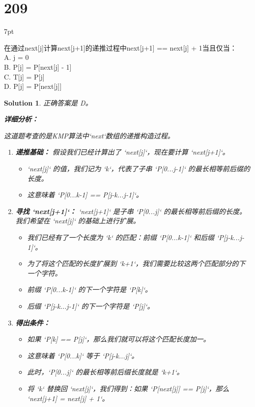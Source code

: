 \documentclass[UTF8]{report}
\newtheorem{solution}{Solution}
\theoremstyle{MyLineTheoremStyle} %
\theoremstyle{MyBlockTheoremStyle} %
\theoremstyle{MySubsubsectionStyle} %
\newenvironment{graybox}{%
        \def\FrameCommand{%
        \hspace{1pt}%
        {\color{gray}\small \vrule width 2pt}%
        {\color{graybox_color}\vrule width 4pt}%
        \colorbox{graybox_color}%
        }%
        \MakeFramed{\advance\hsize-\width\FrameRestore}%
        \noindent\hspace{-4.55pt}%
        \begin{adjustwidth}{}{7pt}%
        \vspace{2pt}\vspace{2pt}%
        }
        {%
        \vspace{2pt}\end{adjustwidth}\endMakeFramed%
        }
\begin{document}
\section*{209}
\begin{graybox}
在通过next[j]计算next[j+1]的递推过程中next[j+1] == next[j] + 1当且仅当：\\
A. j = 0\\
B. P[j] = P[next[j] - 1]\\
C. T[j] = P[j]\\
D. P[j] = P[next[j]]
\end{graybox}

\begin{solution}
正确答案是 D。

\textbf{详细分析：}

这道题考查的是KMP算法中`next`数组的递推构造过程。

\begin{enumerate}
    \item \textbf{递推基础：}
    假设我们已经计算出了 `next[j]`，现在要计算 `next[j+1]`。
    \begin{itemize}
        \item `next[j]` 的值，我们记为 `k`，代表了子串 `P[0...j-1]` 的最长相等前后缀的长度。
        \item 这意味着 `P[0...k-1] == P[j-k...j-1]`。
    \end{itemize}

    \item \textbf{寻找 `next[j+1]`：}
    `next[j+1]` 是子串 `P[0...j]` 的最长相等前后缀的长度。我们希望在 `next[j]` 的基础上进行扩展。
    \begin{itemize}
        \item 我们已经有了一个长度为 `k` 的匹配：前缀 `P[0...k-1]` 和后缀 `P[j-k...j-1]`。
        \item 为了将这个匹配的长度扩展到 `k+1`，我们需要比较这两个匹配部分的下一个字符。
        \item 前缀 `P[0...k-1]` 的下一个字符是 `P[k]`。
        \item 后缀 `P[j-k...j-1]` 的下一个字符是 `P[j]`。
    \end{itemize}

    \item \textbf{得出条件：}
    \begin{itemize}
        \item 如果 `P[k] == P[j]`，那么我们就可以将这个匹配长度加一。
        \item 这意味着 `P[0...k]` 等于 `P[j-k...j]`。
        \item 此时，`P[0...j]` 的最长相等前后缀长度就是 `k+1`。
        \item 将 `k` 替换回 `next[j]`，我们得到：如果 `P[next[j]] == P[j]`，那么 `next[j+1] = next[j] + 1`。
    \end{itemize}
\end{enumerate}


\end{solution}
\end{document}
